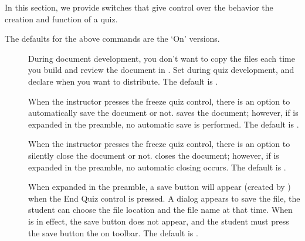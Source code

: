 \documentclass{article}
\begin{document}
In this section, we provide switches that give control over the behavior the creation
and function of a quiz.
\bVerb\small\takeMeasure{\string\distrToStudentsOn  \string\distrToStudentsOff}%
\begin{dCmd}[fontsize=\small,commandchars=!()]{\bxSize}
\autoCopyOn  \autoCopyOff

\instrAutoSaveOn   \instrAutoSaveOff
\instrAutoCloseOn  \instrAutoCloseOff

\stuAutoSaveOn  \stuAutoSaveOff
\stuAutoCloseOn \stuAutoCloseOff

\distrToInstrOn  \distrToInstrOff
\distrToStudentsOn  \distrToStudentsOff
\end{dCmd}
\eVerb The defaults for the above commands are the `On' versions.
\begin{description}
\item[\cmd\autoCopyOn] During document development, you don't want to copy
    the files each time you build and review the document in .
    Set  during quiz development, and declare
     when you want to distribute. The default is
    .

\item[] When the instructor presses the freeze quiz
    control, there is an option to automatically save the document or not.
     saves the document; however, if
     is expanded in the preamble, no automatic save is
    performed. The default is .

\item[] When the instructor presses the freeze quiz control, there is an option
    to silently close the document or not.  closes the document; however, if
     is expanded in the preamble, no automatic
    closing occurs. The default is \cmd{\instrAutoCloseOn}.

\item[] When expanded in the preamble, a save button will appear
    (created by ) when the \textsf{End Quiz} control is pressed. A
    dialog appears to save the file, the student can choose the file
    location and the file name at that time. When  is in
    effect, the save button does not appear, and the student must press the
    save button the on  toolbar. The default is
    .


\end{description}
\end{document}

